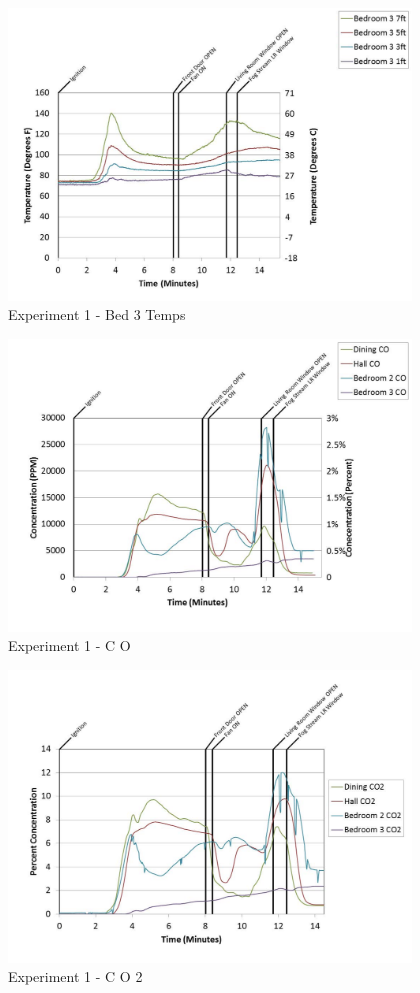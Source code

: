 \documentclass{article}
\begin{document}
\begin{appendices}
	\begin{figure}[h!]
		\centering
		\includegraphics[height=3.05in]{0_Images/Results_Charts/Exp_1_Charts/Bed3Temps.pdf}
		\caption{Experiment 1 - Bed 3 Temps}
	\end{figure}
 
	\clearpage

	\begin{figure}[h!]
		\centering
		\includegraphics[height=3.05in]{0_Images/Results_Charts/Exp_1_Charts/CO.pdf}
		\caption{Experiment 1 - C O}
	\end{figure}
 

	\begin{figure}[h!]
		\centering
		\includegraphics[height=3.05in]{0_Images/Results_Charts/Exp_1_Charts/CO2.pdf}
		\caption{Experiment 1 - C O 2}
	\end{figure}
 

\end{appendices}
\end{document}
